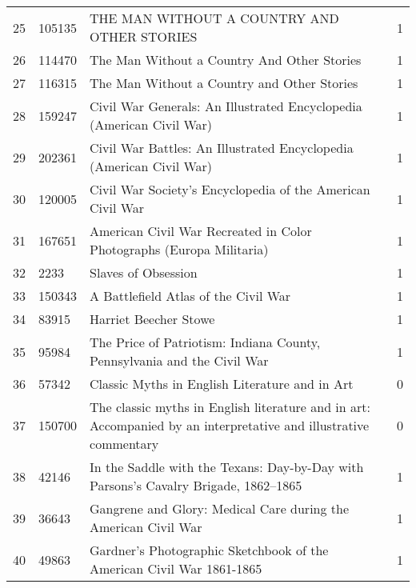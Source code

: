 \begin{tabular}{llll}
25 & 105135 & THE MAN WITHOUT A COUNTRY AND OTHER STORIES & 1 \\
26 & 114470 & The Man Without a Country And Other Stories & 1 \\
27 & 116315 & The Man Without a Country and Other Stories & 1 \\
28 & 159247 & Civil War Generals: An Illustrated Encyclopedia (American Civil War) & 1 \\
29 & 202361 & Civil War Battles: An Illustrated Encyclopedia (American Civil War) & 1 \\
30 & 120005 & Civil War Society's Encyclopedia of the American Civil War & 1 \\
31 & 167651 & American Civil War Recreated in Color Photographs (Europa Militaria) & 1 \\
32 & 2233 & Slaves of Obsession & 1 \\
33 & 150343 & A Battlefield Atlas of the Civil War & 1 \\
34 & 83915 & Harriet Beecher Stowe & 1 \\
35 & 95984 & The Price of Patriotism: Indiana County, Pennsylvania and the Civil War & 1 \\
36 & 57342 & Classic Myths in English Literature and in Art & 0 \\
37 & 150700 & The classic myths in English literature and in art: Accompanied by an interpretative and illustrative commentary & 0 \\
38 & 42146 & In the Saddle with the Texans: Day-by-Day with Parsons's Cavalry Brigade, 1862--1865 & 1 \\
39 & 36643 & Gangrene and Glory: Medical Care during the American Civil War & 1 \\
40 & 49863 & Gardner's Photographic Sketchbook of the American Civil War 1861-1865 & 1 \\
\bottomrule
\end{tabular}
